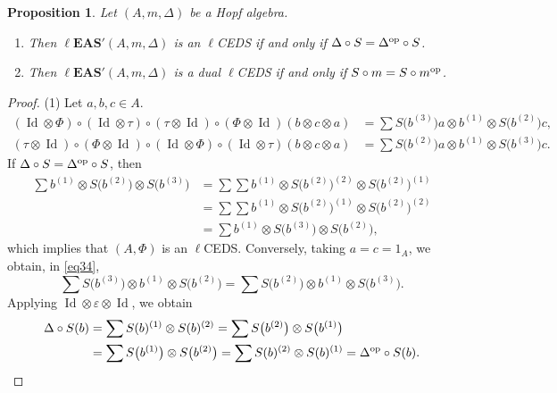 \documentclass[pdftex]{sigma}
\numberwithin{equation}{section}
\newtheorem{Proposition}[Theorem]{Proposition}
 { \theoremstyle{definition}
\newtheorem{Definition}[Theorem]{Definition}
\newtheorem{Note}[Theorem]{Note}
\newtheorem{Example}[Theorem]{Example}
\newtheorem{Remark}[Theorem]{Remark}
\newtheorem{Notation}[Theorem]{Notation}}
\newcommand{\leas}{\ell\mathbf{EAS}}
\begin{document}
\begin{Proposition}
Let $(A,m,\Delta)$ be a Hopf algebra.
\begin{enumerate}\itemsep=0pt
\item[$(1)$] Then $\leas'(A,m,\Delta)$ is an $\ell$CEDS if and only if $\Delta \circ S=\Delta^{\rm op}\circ S$.
\item[$(2)$] Then $\leas'(A,m,\Delta)$ is a dual $\ell$CEDS if and only if $S\circ m=S\circ m^{\rm op}$.
\end{enumerate}
\end{Proposition}

\begin{proof}
(1) Let $a,b,c\in A$.
\begin{align}
\label{eq34} (\operatorname{Id} \otimes \Phi)\circ (\operatorname{Id} \otimes \tau)\circ (\tau \otimes \operatorname{Id})\circ (\Phi\otimes \operatorname{Id})(b\otimes c\otimes a)&=\sum S\bigl(b^{(3)}\bigr)a\otimes b^{(1)}\otimes S\bigl(b^{(2)}\bigr)c,\\
\nonumber (\tau \otimes \operatorname{Id})\circ (\Phi\otimes \operatorname{Id})\circ (\operatorname{Id} \otimes \Phi)\circ (\operatorname{Id} \otimes \tau)(b\otimes c\otimes a)&=\sum S\bigl(b^{(2)}\bigr)a\otimes b^{(1)}\otimes S\bigl(b^{(3)}\bigr)c.
\end{align}
If $\Delta \circ S=\Delta^{\rm op}\circ S$, then
\begin{align*}
\sum b^{(1)}\otimes S\bigl(b^{(2)}\bigr)\otimes S\bigl(b^{(3)}\bigr)&=\sum \sum b^{(1)}\otimes S\bigl(b^{(2)}\bigr)^{(2)} \otimes S\bigl(b^{(2)}\bigr)^{(1)}\\
&=\sum \sum b^{(1)}\otimes S\bigl(b^{(2)}\bigr)^{(1)} \otimes S\bigl(b^{(2)}\bigr)^{(2)}\\
&=\sum b^{(1)}\otimes S\bigl(b^{(3)}\bigr)\otimes S\bigl(b^{(2)}\bigr),
\end{align*}
which implies that $(A,\Phi)$ is an $\ell$CEDS. Conversely, taking $a=c=1_A$, we obtain, in \eqref{eq34},
\[\sum S\bigl(b^{(3)}\bigr)\otimes b^{(1)}\otimes S\bigl(b^{(2)}\bigr)=\sum S\bigl(b^{(2)}\bigr)\otimes b^{(1)}\otimes S\bigl(b^{(3)}\bigr).\]
Applying $\operatorname{Id} \otimes \varepsilon \otimes \operatorname{Id}$, we obtain
\begin{align*}
\Delta \circ S(b)&=\sum S(b)^{(1)}\otimes S(b)^{(2)}=\sum S\bigl(b^{(2)}\bigr)\otimes S\bigl(b^{(1)}\bigr)\\
&=\sum S\bigl(b^{(1)}\bigr)\otimes S\bigl(b^{(2)}\bigr)=\sum S(b)^{(2)}\otimes S(b)^{(1)}=\Delta^{\rm op}\circ S(b).
\end{align*}


\end{proof}
\end{document}
